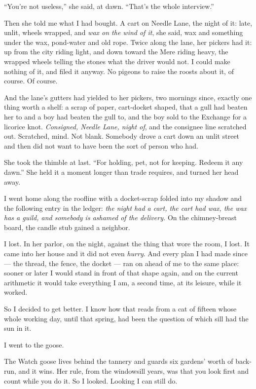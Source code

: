 ``You're not useless,'' she said, at dawn. ``That's the whole interview.''

Then she told me what I had bought. A cart on Needle Lane, the night of it: late, unlit, wheels wrapped, and \emph{wax on the wind of it}, she said, wax and something under the wax, pond-water and old rope. Twice along the lane, her pickers had it: up from the city riding light, and down toward the Mere riding heavy, the wrapped wheels telling the stones what the driver would not. I could make nothing of it, and filed it anyway. No pigeons to raise the roosts about it, of course. Of course.

And the lane's gutters had yielded to her pickers, two mornings since, exactly one thing worth a shelf: a scrap of paper, cart-docket shaped, that a gull had beaten her to and a boy had beaten the gull to, and the boy sold to the Exchange for a licorice knot. \emph{Consigned, Needle Lane, night of}, and the consignee line scratched out. Scratched, mind. Not blank. Somebody drove a cart down an unlit street and then did not want to have been the sort of person who had.

She took the thimble at last. ``For holding, pet, not for keeping. Redeem it any dawn.'' She held it a moment longer than trade requires, and turned her head away.

I went home along the roofline with a docket-scrap folded into my shadow and the following entry in the ledger: \emph{the night had a cart, the cart had wax, the wax has a guild, and somebody is ashamed of the delivery.} On the chimney-breast board, the candle stub gained a neighbor.

\scenebreak

I lost. In her parlor, on the night, against the thing that wore the room, I lost. It came into her house and it did not even \emph{hurry}. And every plan I had made since --- the thread, the fence, the docket --- ran on ahead of me to the same place: sooner or later I would stand in front of that shape again, and on the current arithmetic it would take everything I am, a second time, at its leisure, while it worked.

So I decided to get better. I know how that reads from a cat of fifteen whose whole working day, until that spring, had been the question of which sill had the sun in it.

I went to the goose.

The Watch goose lives behind the tannery and guards six gardens' worth of back-run, and it wins. Her rule, from the windowsill years, was that you look first and count while you do it. So I looked. Looking I can still do.

